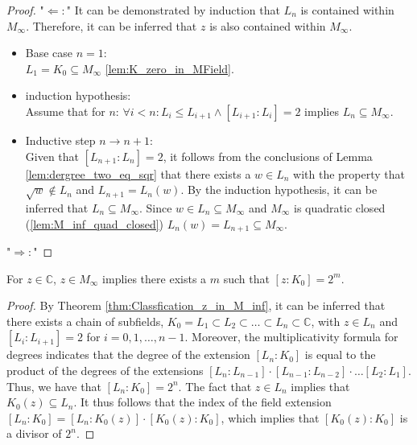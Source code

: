 \begin{proof}
    "$\Leftarrow:$"
    It can be demonstrated by induction that $L_n$ is contained within $M_{\infty}$. 
    Therefore, it can be inferred that $z$ is also contained within $M_{\infty}$.
    \begin{itemize}
        \item Base case $n=1$: \\
            $L_1 = K_0 \subseteq M_{\infty}$ \ref{lem:K_zero_in_MField}.
        
        \item induction hypothesis: \\
            Assume that for $n$: $\forall i < n: L_i \le L_{i+1} \land [L_{i+1}:L_i]=2$ implies $L_n \subseteq M_{\infty}$.
        \item Inductive step $n \to n+1$: \\
            Given that $[L_{n+1}:L_n] = 2$, it follows from the conclusions of Lemma \ref{lem:dergree_two_eq_sqr} that there exists a $w \in L_n$ with the property that $ \sqrt{w} \notin L_n$ and $L_{n+1} = L_n(w)$.
            By the induction hypothesis, it can be inferred that $L_n \subseteq M_{\infty}$. Since $w \in L_n  \subseteq M_{\infty}$ and $ M_{\infty}$ is quadratic closed (\ref{lem:M_inf_quad_closed}) $L_n(w) = L_{n+1} \subseteq M_{\infty}$.
    \end{itemize}
    "$\Rightarrow:$"

\end{proof}

\begin{lemma}
    \label{lem:Classfication_z_in_M_inf_2m}
    For $z \in \mathbb{C}$, $z \in M_{\infty}$ implies there exists a $m$ such that $[z:K_0] = 2^m$.
\end{lemma}

\begin{proof}
    By Theorem \ref{thm:Classfication_z_in_M_inf}, it can be inferred that there exists a chain of subfields, $K_0 = L_1 \subset L_2 \subset \dots \subset L_n \subset \mathbb{C}$, with $z \in L_n$ and $[L_i : L_{i+1}] = 2$ for $i = 0, 1, \dots, n-1$. 
    Moreover, the multiplicativity formula for degrees indicates that the degree of the extension $[L_n : K_0]$ is equal to the product of the degrees of the extensions $[L_n : L_{n-1}] \cdot [L_{n-1} : L_{n-2}] \cdot \dots [L_2 : L_1]$.
    Thus, we have that $[L_n : K_0] = 2^n$. 
    The fact that $z\in L_n$ implies that $K_0(z)\subseteq L_n$. 
    It thus follows that the index of the field extension $[L_n : K_0] = [L_n : K_0(z)]\cdot [K_0(z) : K_0]$, which implies that $[K_0(z) : K_0]$ is a divisor of $2^n$. 
\end{proof}

